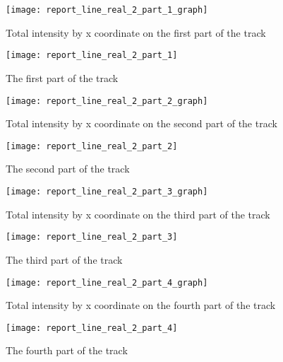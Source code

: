 \documentclass[a4paper,12pt,oneside]{report}
\begin{document}
\begin{figure}[h]
    \begin{minipage}[c]{.47\linewidth}
        \centering
        \texttt{[image: report\_line\_real\_2\_part\_1\_graph]}
        \caption{Total intensity by x coordinate on the first part of the track}
        \label{graphPart1Track2}
    \end{minipage}
    \hfill
    \begin{minipage}[c]{.47\linewidth}
        \centering
        \texttt{[image: report\_line\_real\_2\_part\_1]}
        \caption{The first part of the track}
    \end{minipage}
\end{figure}
\hfill
\begin{figure}[h]
    \begin{minipage}[c]{.47\linewidth}
        \centering
        \texttt{[image: report\_line\_real\_2\_part\_2\_graph]}
        \caption{Total intensity by x coordinate on the second part of the track}
        \label{graphPart2Track2}
    \end{minipage}
    \hfill
    \begin{minipage}[c]{.47\linewidth}
        \centering
        \texttt{[image: report\_line\_real\_2\_part\_2]}
        \caption{The second part of the track}
    \end{minipage}
\end{figure}
\begin{figure}[h]
    \begin{minipage}[c]{.47\linewidth}
        \centering
        \texttt{[image: report\_line\_real\_2\_part\_3\_graph]}
        \caption{Total intensity by x coordinate on the third part of the track}
        \label{graphPart3Track2}
    \end{minipage}
    \hfill
    \begin{minipage}[c]{.47\linewidth}
        \centering
        \texttt{[image: report\_line\_real\_2\_part\_3]}
        \caption{The third part of the track}
    \end{minipage}
\end{figure}
\begin{figure}[h]
    \begin{minipage}[c]{.47\linewidth}
        \centering
        \texttt{[image: report\_line\_real\_2\_part\_4\_graph]}
        \caption{Total intensity by x coordinate on the fourth part of the track}
        \label{graphPart4Track2}
    \end{minipage}
    \hfill
    \begin{minipage}[c]{.47\linewidth}
        \centering
        \texttt{[image: report\_line\_real\_2\_part\_4]}
        \caption{The fourth part of the track}
    \end{minipage}
\end{figure}
\end{document}
